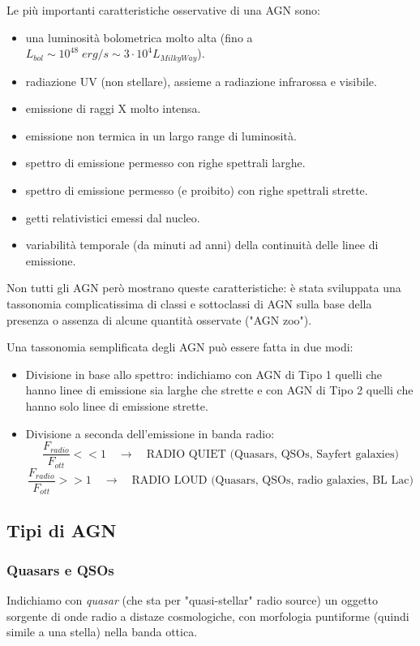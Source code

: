 Le più importanti caratteristiche osservative di una AGN sono:
\begin{itemize}
    \item una luminosità bolometrica molto alta (fino a $L_{bol} \sim 10^{48} \;\si{erg}/\si{s} \sim 3\cdot 10^4 L_{Milky Way}$).
    \item radiazione UV (non stellare), assieme a radiazione infrarossa e visibile.
    \item emissione di raggi X molto intensa.
    \item emissione non termica in un largo range di luminosità.
    \item spettro di emissione permesso con righe spettrali larghe.
    \item spettro di emissione permesso (e proibito) con righe spettrali strette. 
    \item getti relativistici emessi dal nucleo.
    \item variabilità temporale (da minuti ad anni) della continuità delle linee di emissione.
\end{itemize}
Non tutti gli AGN però mostrano queste caratteristiche: è stata sviluppata una tassonomia complicatissima di classi e sottoclassi di AGN sulla base della presenza o assenza di alcune quantità osservate ("AGN zoo").

Una tassonomia semplificata degli AGN può essere fatta in due modi:
\begin{itemize}
    \item Divisione in base allo spettro: indichiamo con AGN di Tipo 1 quelli che hanno linee di emissione sia larghe che strette e con AGN di Tipo 2 quelli che hanno solo linee di emissione strette.
    \item Divisione a seconda dell'emissione in banda radio: 
    \begin{equation*}
        \frac{F_{radio}}{F_{ott}} << 1 \quad \rightarrow \quad \text{RADIO QUIET (Quasars, QSOs, Sayfert galaxies)}
    \end{equation*}
    \begin{equation*}
        \frac{F_{radio}}{F_{ott}} >> 1 \quad \rightarrow \quad \text{RADIO LOUD (Quasars, QSOs, radio galaxies, BL Lac)}
    \end{equation*}
\end{itemize}

\subsection{Tipi di AGN}
\subsubsection{Quasars e QSOs}
Indichiamo con \emph{quasar} (che sta per "quasi-stellar" radio source) un oggetto sorgente di onde radio a distaze cosmologiche, con morfologia puntiforme (quindi simile a una stella) nella banda ottica. 

